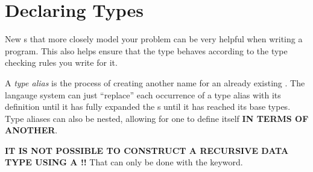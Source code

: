 \section{Declaring Types}\label{sec:Declaring_Types}
New s that more closely model your problem can be very helpful when writing a program.
This also helps ensure that the type behaves according to the type checking rules you write for it.



\begin{definition}\label{def:Type_Alias}
  A \emph{type alias} is the process of creating another name for an already existing .
  The langauge system can just ``replace'' each occurrence of a type alias with its definition until it has fully expanded the s until it has reached its base types.
  Type aliases can also be nested, allowing for one to define itself \textbf{IN TERMS OF ANOTHER}.

  \begin{remark}\label{rmk:Recursive_Type_Alias}
    \textbf{IT IS NOT POSSIBLE TO CONSTRUCT A RECURSIVE DATA TYPE USING A !!}
    That can only be done with the  keyword.
  \end{remark}
\end{definition}

